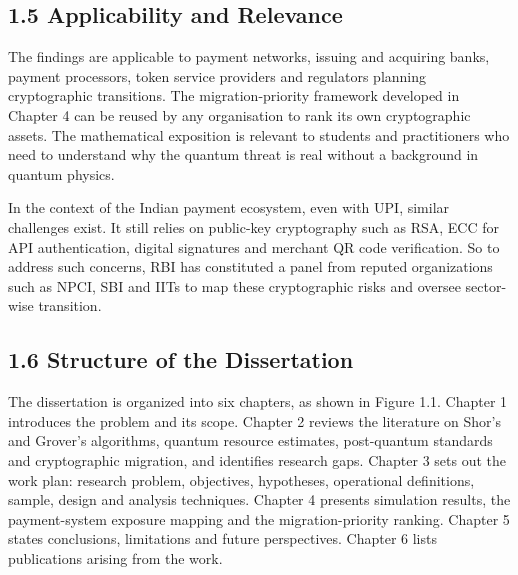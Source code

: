 \documentclass[12pt,oneside]{report}
\begin{document}
\subsection*{1.5 Applicability and Relevance}

The findings are applicable to payment networks, issuing and acquiring banks, payment processors, token service providers and regulators planning cryptographic transitions. The migration-priority framework developed in Chapter 4 can be reused by any organisation to rank its own cryptographic assets. The mathematical exposition is relevant to students and practitioners who need to understand why the quantum threat is real without a background in quantum physics.
\par

In the context of the Indian payment ecosystem, even with UPI, similar challenges exist. It still relies on public-key cryptography such as RSA, ECC for API authentication, digital signatures and merchant QR code verification. So to address such concerns, RBI has constituted a panel from reputed organizations such as NPCI, SBI and IITs to map these cryptographic risks and oversee sector-wise transition. 
\par

\subsection*{1.6 Structure of the Dissertation}

The dissertation is organized into six chapters, as shown in Figure 1.1. Chapter 1 introduces the problem and its scope. Chapter 2 reviews the literature on Shor's and Grover's algorithms, quantum resource estimates, post-quantum standards and cryptographic migration, and identifies research gaps. Chapter 3 sets out the work plan: research problem, objectives, hypotheses, operational definitions, sample, design and analysis techniques. Chapter 4 presents simulation results, the payment-system exposure mapping and the migration-priority ranking. Chapter 5 states conclusions, limitations and future perspectives. Chapter 6 lists publications arising from the work.
\par
\end{document}
